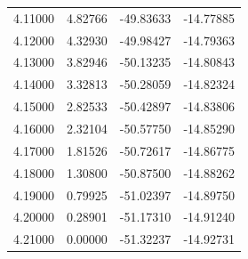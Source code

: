\begin{table}
\begin{tabular}{llll}
4.11000 & 4.82766 & -49.83633 & -14.77885 \\
4.12000 & 4.32930 & -49.98427 & -14.79363 \\
4.13000 & 3.82946 & -50.13235 & -14.80843 \\
4.14000 & 3.32813 & -50.28059 & -14.82324 \\
4.15000 & 2.82533 & -50.42897 & -14.83806 \\
4.16000 & 2.32104 & -50.57750 & -14.85290 \\
4.17000 & 1.81526 & -50.72617 & -14.86775 \\
4.18000 & 1.30800 & -50.87500 & -14.88262 \\
4.19000 & 0.79925 & -51.02397 & -14.89750 \\
4.20000 & 0.28901 & -51.17310 & -14.91240 \\
4.21000 & 0.00000 & -51.32237 & -14.92731 \\
\bottomrule
\end{tabular}
\end{table}
